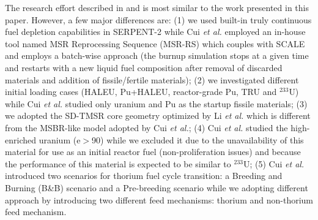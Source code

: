\documentclass[answers,11pt]{exam}
\begin{document}
\begin{questions}
\begin{solution}
                The research effort described in \cite{cui2017transition} and
                \cite{cui2018possible} is most similar to the work
                presented in this paper. However, a few major differences
                are: (1) we used built-in truly continuous fuel depletion capabilities in
                SERPENT-2 \cite{aufiero2013extended} while Cui \emph{et al.} employed an in-house tool named MSR
                Reprocessing Sequence (MSR-RS) \cite{ZOU2015114} which couples with SCALE and employs a batch-wise approach (the burnup simulation stops at a given time and restarts with a new liquid fuel composition after removal of discarded materials and addition of fissile/fertile materials); (2) we investigated different initial loading cases (HALEU, Pu+HALEU, reactor-grade Pu, TRU and $^{233}$U) while Cui \emph{et al.} studied only uranium and Pu as the startup fissile materials; (3) we adopted the SD-TMSR core geometry optimized by Li \emph{et al.} \cite{li_optimization_2018} which is different from the MSBR-like model adopted by Cui \emph{et al.}; (4) Cui \emph{et al.} studied the high-enriched uranium (e$>$90) while we excluded it due to the unavailability of this material for use as an initial reactor fuel (non-proliferation issues) and because the performance of this material is expected to be similar to $^{233}$U; (5) Cui \emph{et al.} introduced two scenarios for thorium fuel cycle transition: a Breeding and Burning (B\&B) scenario and a Pre-breeding scenario while we adopting different approach by introducing two different feed mechanisms: thorium and non-thorium feed mechanism.
                

\end{solution}
\end{questions}
\end{document}
